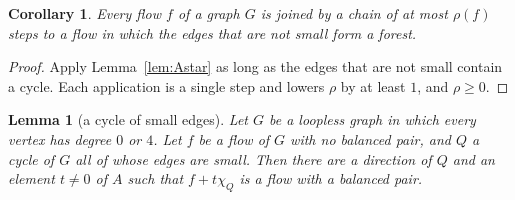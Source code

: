 \documentclass[11pt]{article}
\newtheorem{lemma}[theorem]{Lemma}
\newtheorem{corollary}[theorem]{Corollary}
\theoremstyle{definition}
\begin{document}
\begin{corollary}\label{cor:forest}
Every flow $f$ of a graph $G$ is joined by a chain of at most $\rho(f)$ steps to a flow in which the edges that are
not small form a forest.
\end{corollary}
\begin{proof}
Apply Lemma~\ref{lem:Astar} as long as the edges that are not small contain a cycle. Each application is a single step and lowers $\rho$ by at least $1$, and $\rho\ge 0$.
\end{proof}

\begin{lemma}[a cycle of small edges]\label{lem:Bstar}
Let $G$ be a loopless graph in which every vertex has degree $0$ or $4$. Let $f$ be a flow of $G$ with no balanced
pair, and $Q$ a cycle of $G$ all of whose edges are small. Then there are a direction of $Q$ and an element $t\ne 0$ of $A$ such that $f+t\chi_Q$ is a flow with a balanced pair.
\end{lemma}
\end{document}
